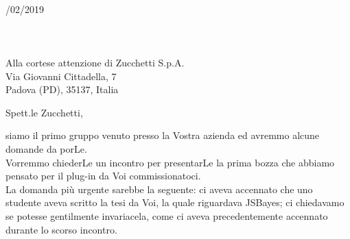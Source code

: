 \documentclass[11pt, a4paper]{letter} %
\begin{document}

\begin{letter}{
	\-\\/02/2019
	\-\\\-\\\-\\\-\\
	Alla cortese attenzione di Zucchetti S.p.A. \\
	Via Giovanni Cittadella, 7\\
	Padova (PD), 35137, Italia
}


\opening{Spett.le Zucchetti,}

siamo il primo gruppo venuto presso la Vostra azienda ed avremmo alcune domande da porLe.\\
Vorremmo chiederLe un incontro per presentarLe la prima bozza che abbiamo pensato per il plug-in da Voi commissionatoci. \\
La domanda più urgente sarebbe la seguente: ci aveva accennato che uno studente aveva scritto la tesi da Voi, la quale riguardava JSBayes; ci chiedavamo se potesse gentilmente invariacela, come ci aveva precedentemente accennato durante lo scorso incontro.\\



\end{letter}
\end{document}
